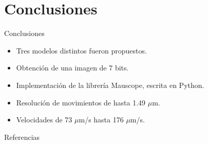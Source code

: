 \documentclass{beamer}
\begin{document}
    \section{Conclusiones}
    \begin{frame}{Conclusiones}
        \begin{itemize}
        	\item Tres modelos distintos fueron propuestos.
        	\item Obtención de una imagen de 7 bits.
        	\item Implementación de la librería Mauscope, escrita en Python.
        	\item Resolución de movimientos de hasta 1.49 $\mu$m. 
        	\item Velocidades de 73 $\mu$m/s hasta 176 $\mu$m/s.
        \end{itemize}
    \end{frame}
    
    \nocite{*}
    \begin{frame}{Referencias}
        \printbibliography
    \end{frame}
\end{document}
